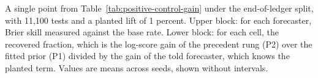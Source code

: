 \begin{table}[tp]\centering\scriptsize
\caption{A single point from Table~\ref{tab:positive-control-gain} under the end-of-ledger split, with 11,100 tests and a planted lift of 1 percent. Upper block: for each forecaster, Brier skill measured against the base rate. Lower block: for each cell, the recovered fraction, which is the log-score gain of the precedent rung (P2) over the fitted prior (P1) divided by the gain of the told forecaster, which knows the planted term. Values are means across seeds, shown without intervals.}
\label{tab:fmt-app-pc-point}

\end{table}

